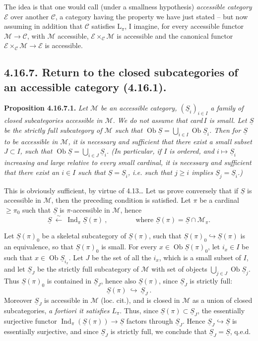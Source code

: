 \documentclass[11pt]{article}
\newcommand{\printedpage}[1]{\marginpar{\footnotesize p.~#1}}
\newcommand{\msp}[1]{\marginpar{\footnotesize [#1]}}
\newcommand{\Ob}{\operatorname{Ob}}
\newcommand{\Ind}{\operatorname{Ind}}
\newcommand{\cM}{\mathcal{M}}
\newcommand{\cE}{\mathcal{E}}
\newcommand{\cC}{\mathcal{C}}
\newcommand{\uS}{\underline{S}}
\begin{document}
\msp{page 476bis}
The idea is that one would call (under a smallness hypothesis) \textit{accessible category $\cE$} over another $\cC$, a category having the property we have just stated -- but now assuming in addition that $\cC$ satisfies $\mathrm{L}_\pi$, I imagine, for every accessible functor $\cM \longrightarrow \cC$, with $\cM$ accessible, $\cE \times_{\cC} \cM$ is accessible and the canonical functor $\cE \times_{\cC} \cM \longrightarrow \cE$ is accessible.

\msp{page 477}
\subsection*{4.16.7. Return to the closed subcategories of an accessible category (4.16.1).}

\textbf{Proposition 4.16.7.1.} \textit{Let $\cM$ be an accessible category, $(\uS_i)_{i\in I}$ a family of closed subcategories accessible in $\cM$. We do not assume that \textup{card}\,$I$ is small. Let $\uS$ be the strictly full subcategory of $\cM$ such that $\Ob \uS = \bigcup_{i\in I} \Ob \uS_i$. Then for $\uS$ %
\printedpage{185}
to be accessible in $\cM$, it is necessary and sufficient that there exist a \textup{small} subset $J \subset I$, such that $\Ob \uS = \bigcup_{i\in J} \uS_i$. (In particular, if $I$ is ordered, and $i \longmapsto \uS_i$ increasing and large relative to every small cardinal, it is necessary and sufficient that there exist an $i \in I$ such that $\uS = \uS_i$, i.e. such that $j \geqslant i$ implies $\uS_j = \uS_i$.)}

This is obviously sufficient, by virtue of 4.13\dots{} Let us prove conversely that if $\uS$ is accessible in $\cM$, then the preceding condition is satisfied. Let $\pi$ be a cardinal $\geqslant \pi_0$ such that $\uS$ is $\pi$-accessible in $\cM$, hence
\[
\uS \ \xleftarrow{\ \sim\ }\ \Ind_\pi \uS(\pi) \ , \qquad\qquad \text{where } \uS(\pi) = \uS \cap \cM_\pi.
\]

\msp{page 478}
Let $\uS(\pi)_0$ be a skeletal subcategory of $\uS(\pi)$, such that $\uS(\pi)_0 \hookrightarrow \uS(\pi)$ is an equivalence, so that $\uS(\pi)_0$ is small. For every $x \in \Ob \uS(\pi)_0$, let $i_x \in I$ be such that $x \in \Ob \uS_{i_x}$. Let $J$ be the set of all the $i_x$, which is a small subset of $I$, and let $\uS_J$ be the strictly full subcategory of $\cM$ with set of objects $\bigcup_{j\in J} \Ob \uS_j$. Thus $\uS(\pi)_0$ is contained in $\uS_J$, hence also $\uS(\pi)$, since $\uS_J$ is strictly full: %
\[
\uS(\pi) \ \hookrightarrow\ \uS_J \ .
\]
Moreover $\uS_J$ is accessible in $\cM$ (loc. cit.), and is closed in $\cM$ as a union of closed subcategories, \textit{a fortiori it satisfies $L_\pi$}. Thus, since $\uS(\pi) \subset \uS_J$, the essentially surjective functor $\Ind_\pi(\uS(\pi)) \longrightarrow \uS$ factors through $\uS_J$. Hence $\uS_J \hookrightarrow \uS$ is essentially surjective, and since $\uS_J$ is strictly full, we conclude that $\uS_J = \uS$, q.e.d.
\end{document}
